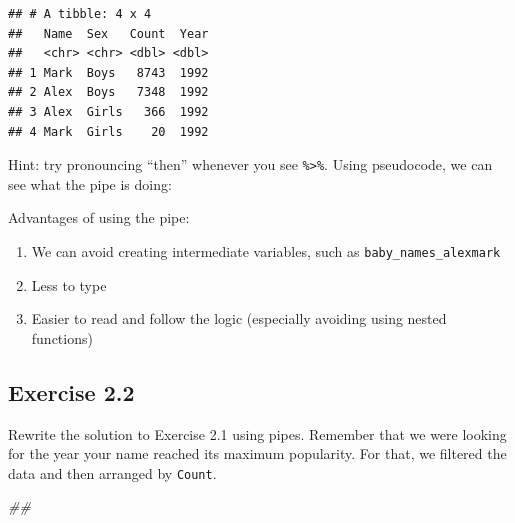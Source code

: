 \documentclass[
]{book}
\newenvironment{Shaded}{\begin{snugshade}}{\end{snugshade}}
\newcommand{\CommentTok}[1]{\textcolor[rgb]{0.56,0.35,0.01}{\textit{#1}}}
\newcommand{\KeywordTok}[1]{\textcolor[rgb]{0.13,0.29,0.53}{\textbf{#1}}}
\newcommand{\NormalTok}[1]{#1}
\newcommand{\OperatorTok}[1]{\textcolor[rgb]{0.81,0.36,0.00}{\textbf{#1}}}
\newcommand{\StringTok}[1]{\textcolor[rgb]{0.31,0.60,0.02}{#1}}
\providecommand{\tightlist}{%
  \setlength{\itemsep}{0pt}\setlength{\parskip}{0pt}}
\begin{document}
\begin{verbatim}
## # A tibble: 4 x 4
##   Name  Sex   Count  Year
##   <chr> <chr> <dbl> <dbl>
## 1 Mark  Boys   8743  1992
## 2 Alex  Boys   7348  1992
## 3 Alex  Girls   366  1992
## 4 Mark  Girls    20  1992
\end{verbatim}

Hint: try pronouncing ``then'' whenever you see \texttt{\%\textgreater{}\%}. Using pseudocode,
we can see what the pipe is doing:

\begin{Shaded}
\end{Shaded}

Advantages of using the pipe:

\begin{enumerate}
\def\labelenumi{\arabic{enumi}.}
\tightlist
\item
  We can avoid creating intermediate variables, such as \texttt{baby\_names\_alexmark}
\item
  Less to type
\item
  Easier to read and follow the logic (especially avoiding using nested functions)
\end{enumerate}

\hypertarget{exercise-2.2}{%
\subsection{Exercise 2.2}\label{exercise-2.2}}

Rewrite the solution to Exercise 2.1 using pipes. Remember that we were looking
for the year your name reached its maximum popularity. For that, we filtered
the data and then arranged by \texttt{Count}.

\begin{Shaded}
\begin{Highlighting}[]
\CommentTok{##}
\end{Highlighting}
\end{Shaded}
\end{document}
